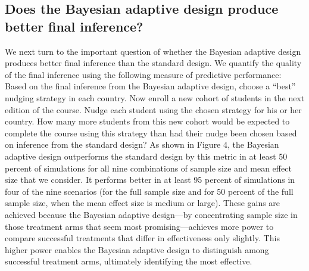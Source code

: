 \documentclass{acm_proc_article-sp}
\begin{document}
\subsection{Does the Bayesian adaptive design produce better final inference?}
We next turn to the important question of whether the Bayesian adaptive design produces better final inference than the standard design. We quantify the quality of the final inference using the following measure of predictive performance: Based on the final inference from the Bayesian adaptive design, choose a ``best'' nudging strategy in each country. Now enroll a new cohort of students in the next edition of the course. Nudge each student using the chosen strategy for his or her country. How many more students from this new cohort would be expected to complete the course using this strategy than had their nudge been chosen based on inference from the standard design? 
As shown in Figure 4, the Bayesian adaptive design outperforms the standard design by this metric in at least 50 percent of simulations for all nine combinations of sample size and mean effect size that we consider. It performs better in at least 95 percent of simulations in four of the nine scenarios (for the full sample size and for 50 percent of the full sample size, when the mean effect size is medium or large). These gains are achieved because the Bayesian adaptive design—by concentrating sample size in those treatment arms that seem most promising—achieves more power to compare successful treatments that differ in effectiveness only slightly. This higher power enables the Bayesian adaptive design to distinguish among successful treatment arms, ultimately identifying the most effective. 
\end{document}
